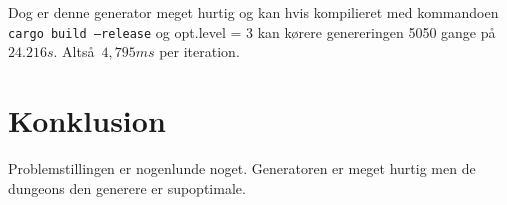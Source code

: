 \documentclass[12pt]{article}
\begin{document}
Dog er denne generator meget hurtig og kan hvis kompilieret med kommandoen \texttt{cargo build --release} og opt.level = 3 kan k\o rere genereringen 5050 gange p\aa\ $24.216s$. Alts\aa\ $4,795ms$ per iteration.

\section{Konklusion}

Problemstillingen er nogenlunde noget. Generatoren er meget hurtig men de dungeons den generere er supoptimale.
\end{document}
